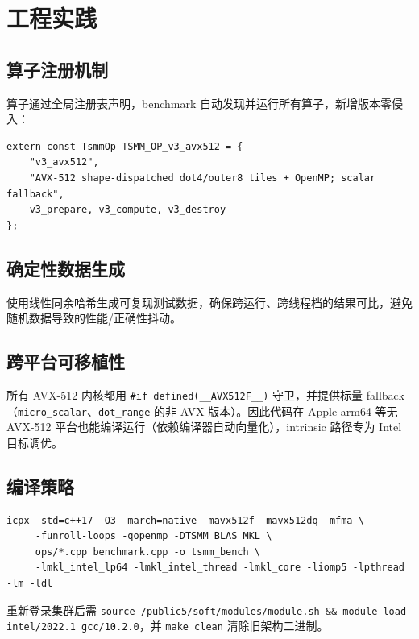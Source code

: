 \documentclass[11pt,a4paper,fontset=fandol]{ctexart}
\begin{document}
\section{工程实践}

\subsection{算子注册机制}
算子通过全局注册表声明，benchmark 自动发现并运行所有算子，新增版本零侵入：
\begin{lstlisting}
extern const TsmmOp TSMM_OP_v3_avx512 = {
    "v3_avx512",
    "AVX-512 shape-dispatched dot4/outer8 tiles + OpenMP; scalar fallback",
    v3_prepare, v3_compute, v3_destroy
};
\end{lstlisting}

\subsection{确定性数据生成}
使用线性同余哈希生成可复现测试数据，确保跨运行、跨线程档的结果可比，避免随机数据导致的性能/正确性抖动。

\subsection{跨平台可移植性}
所有 AVX-512 内核都用 \texttt{\#if defined(\_\_AVX512F\_\_)} 守卫，并提供标量 fallback（\texttt{micro\_scalar}、\texttt{dot\_range} 的非 AVX 版本）。因此代码在 Apple arm64 等无 AVX-512 平台也能编译运行（依赖编译器自动向量化），intrinsic 路径专为 Intel 目标调优。

\subsection{编译策略}
\begin{lstlisting}[style=bashstyle]
icpx -std=c++17 -O3 -march=native -mavx512f -mavx512dq -mfma \
     -funroll-loops -qopenmp -DTSMM_BLAS_MKL \
     ops/*.cpp benchmark.cpp -o tsmm_bench \
     -lmkl_intel_lp64 -lmkl_intel_thread -lmkl_core -liomp5 -lpthread -lm -ldl
\end{lstlisting}
重新登录集群后需 \texttt{source /public5/soft/modules/module.sh \&\& module load intel/2022.1 gcc/10.2.0}，并 \texttt{make clean} 清除旧架构二进制。
\end{document}
